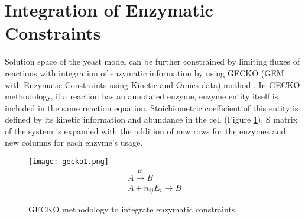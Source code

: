 \section{Integration of Enzymatic Constraints}

Solution space of the yeast model can be further constrained by limiting fluxes of reactions with integration of enzymatic information by using GECKO (GEM with Enzymatic Constraints using Kinetic and Omics data) method \cite{sanchez2017improving}.  In GECKO methodology, if a reaction has an annotated enzyme, enzyme entity itself is included in the same reaction equation. Stoichiometric coefficient of this entity is defined by its kinetic information and abundance in the cell (Figure \ref{fig:gecko1}). S matrix of the system is expanded with the addition of new rows for the enzymes and new columns for each enzyme's usage.

\begin{figure}[H]
\begin{center}
\texttt{[image: gecko1.png]}
\begin{align}
\label{eq:geckoreaction}
 \ A \xrightarrow{E_i} B \\
 \label{eq:gecko}
 \ A + n_{ij}E_i \xrightarrow{} B
\end{align}
\end{center}
\caption[GECKO methodology to integrate enzymatic constraints\cite{sanchez2017improving}]{GECKO methodology to integrate enzymatic constraints\cite{sanchez2017improving}.}
\label{fig:gecko1}
\end{figure}

